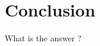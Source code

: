 \documentclass[12pt, a4paper]{article}
\begin{document}
\section{Conclusion}
What is the answer ?

\clearpage







\end{document}
